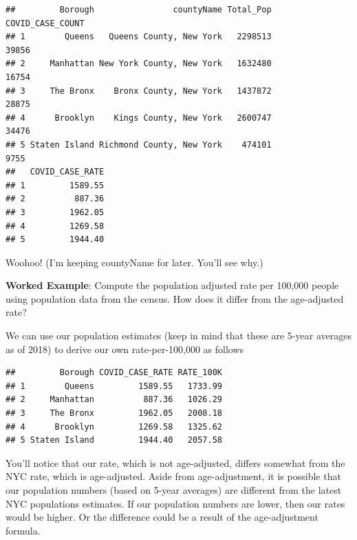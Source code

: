 \documentclass[
  openany]{book}
\newenvironment{Shaded}{\begin{snugshade}}{\end{snugshade}}
\newcommand{\DecValTok}[1]{\textcolor[rgb]{0.00,0.00,0.81}{#1}}
\newcommand{\FunctionTok}[1]{\textcolor[rgb]{0.00,0.00,0.00}{#1}}
\newcommand{\NormalTok}[1]{#1}
\newcommand{\OtherTok}[1]{\textcolor[rgb]{0.56,0.35,0.01}{#1}}
\newcommand{\SpecialCharTok}[1]{\textcolor[rgb]{0.00,0.00,0.00}{#1}}
\begin{document}
\begin{verbatim}
##         Borough                countyName Total_Pop COVID_CASE_COUNT
## 1        Queens   Queens County, New York   2298513            39856
## 2     Manhattan New York County, New York   1632480            16754
## 3     The Bronx    Bronx County, New York   1437872            28875
## 4      Brooklyn    Kings County, New York   2600747            34476
## 5 Staten Island Richmond County, New York    474101             9755
##   COVID_CASE_RATE
## 1         1589.55
## 2          887.36
## 3         1962.05
## 4         1269.58
## 5         1944.40
\end{verbatim}

Woohoo! (I'm keeping countyName for later. You'll see why.)

\textbf{Worked Example}: Compute the population adjusted rate per 100,000 people using population data from the census. How does it differ from the age-adjusted rate?

We can use our population estimates (keep in mind that these are 5-year averages as of 2018) to derive our own rate-per-100,000 as follows

\begin{Shaded}
\end{Shaded}

\begin{verbatim}
##         Borough COVID_CASE_RATE RATE_100K
## 1        Queens         1589.55   1733.99
## 2     Manhattan          887.36   1026.29
## 3     The Bronx         1962.05   2008.18
## 4      Brooklyn         1269.58   1325.62
## 5 Staten Island         1944.40   2057.58
\end{verbatim}

You'll notice that our rate, which is not age-adjusted, differs somewhat from the NYC rate, which is age-adjusted. Aside from age-adjustment, it is possible that our population numbers (based on 5-year averages) are different from the latest NYC populations estimates. If our population numbers are lower, then our rates would be higher. Or the difference could be a result of the age-adjustment formula.
\end{document}

